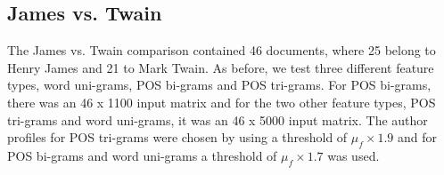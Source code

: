 \documentclass[a4paper,10pt,twoside,fleqn]{article}
\begin{document}
\subsection{James vs. Twain} \label{sec:twain-james}
The James vs. Twain comparison contained 46 documents, where 
25 belong to Henry James and 21 to  Mark Twain. 
As before, we test three different feature types, word uni-grams, 
POS bi-grams and POS tri-grams. 
For POS bi-grams, there was an 46 x 1100 input matrix and for 
the two other feature types, POS tri-grams and word uni-grams, 
it was an 46 x 5000 input matrix. 
The author profiles for POS tri-grams were chosen
by using a threshold of $\mu_f \times 1.9$ and for
POS bi-grams and word uni-grams a threshold of $\mu_f \times 1.7$
was used. 
\end{document}
